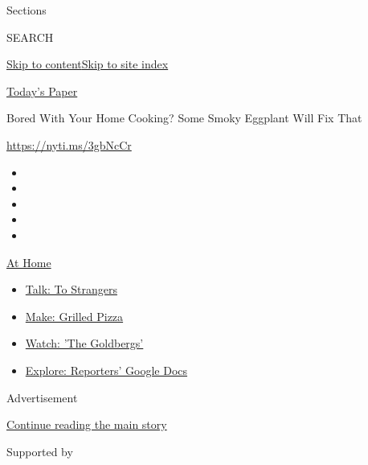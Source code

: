 Sections

SEARCH

\protect\hyperlink{site-content}{Skip to
content}\protect\hyperlink{site-index}{Skip to site index}

\href{https://myaccount.nytimes.com/auth/login?response_type=cookie\&client_id=vi}{}

\href{https://www.nytimes.com/section/todayspaper}{Today's Paper}

Bored With Your Home Cooking? Some Smoky Eggplant Will Fix That

\url{https://nyti.ms/3gbNcCr}

\begin{itemize}
\item
\item
\item
\item
\item
\end{itemize}

\href{https://www.nytimes.com/spotlight/at-home?action=click\&pgtype=Article\&state=default\&region=TOP_BANNER\&context=at_home_menu}{At
Home}

\begin{itemize}
\tightlist
\item
  \href{https://www.nytimes.com/2020/08/03/well/family/the-benefits-of-talking-to-strangers.html?action=click\&pgtype=Article\&state=default\&region=TOP_BANNER\&context=at_home_menu}{Talk:
  To Strangers}
\item
  \href{https://www.nytimes.com/2020/08/01/at-home/coronavirus-make-pizza-on-a-grill.html?action=click\&pgtype=Article\&state=default\&region=TOP_BANNER\&context=at_home_menu}{Make:
  Grilled Pizza}
\item
  \href{https://www.nytimes.com/2020/07/31/arts/television/goldbergs-abc-stream.html?action=click\&pgtype=Article\&state=default\&region=TOP_BANNER\&context=at_home_menu}{Watch:
  'The Goldbergs'}
\item
  \href{https://www.nytimes.com/interactive/2020/at-home/even-more-reporters-editors-diaries-lists-recommendations.html?action=click\&pgtype=Article\&state=default\&region=TOP_BANNER\&context=at_home_menu}{Explore:
  Reporters' Google Docs}
\end{itemize}

Advertisement

\protect\hyperlink{after-top}{Continue reading the main story}

Supported by

